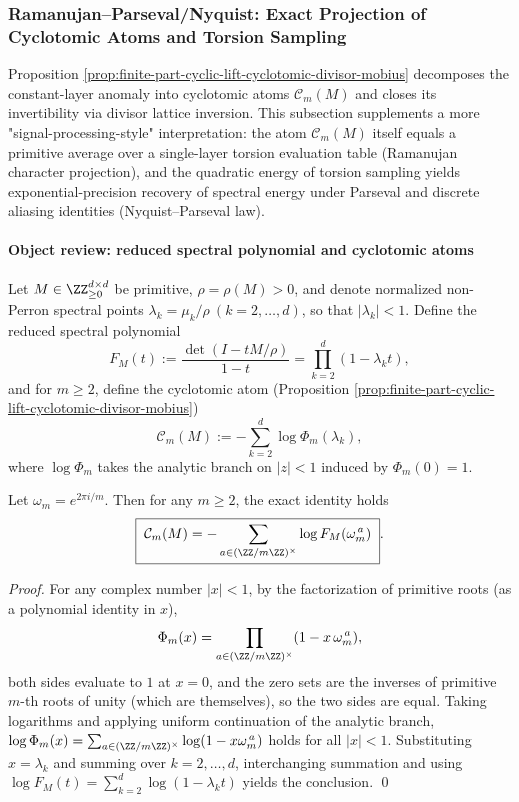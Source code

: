 
\subsubsection{Ramanujan--Parseval/Nyquist: Exact Projection of Cyclotomic Atoms and Torsion Sampling}\label{subsubsec:finite-part-ramanujan-parseval-nyquist}
Proposition \ref{prop:finite-part-cyclic-lift-cyclotomic-divisor-mobius} decomposes the constant-layer anomaly into cyclotomic atoms \(\mathcal{C}_m(M)\) and closes its invertibility via divisor lattice inversion.
This subsection supplements a more "signal-processing-style" interpretation: the atom \(\mathcal{C}_m(M)\) itself equals a primitive average over a single-layer torsion evaluation table (Ramanujan character projection), and the quadratic energy of torsion sampling yields exponential-precision recovery of spectral energy under Parseval and discrete aliasing identities (Nyquist--Parseval law).

\paragraph{Object review: reduced spectral polynomial and cyclotomic atoms}
Let \(M\in\ZZ_{\ge0}^{d\times d}\) be primitive, \(\rho=\rho(M)>0\), and denote normalized non-Perron spectral points \(\lambda_k=\mu_k/\rho\ (k=2,\dots,d)\), so that \(|\lambda_k|<1\).
Define the reduced spectral polynomial
\[
F_M(t):=\frac{\det(I-tM/\rho)}{1-t}=\prod_{k=2}^{d}(1-\lambda_k t),
\]
and for \(m\ge 2\), define the cyclotomic atom (Proposition \ref{prop:finite-part-cyclic-lift-cyclotomic-divisor-mobius})
\[
\mathcal{C}_m(M):=-\sum_{k=2}^{d}\log \Phi_m(\lambda_k),
\]
where \(\log\Phi_m\) takes the analytic branch on \(|z|<1\) induced by \(\Phi_m(0)=1\).

\begin{theorem}\label{thm:finite-part-cyclotomic-atom-primitive-torsion-average}
Let \(\omega_m=e^{2\pi i/m}\). Then for any \(m\ge 2\), the exact identity holds
\[
\boxed{\;
\mathcal{C}_m(M)=-\sum_{a\in(\ZZ/m\ZZ)^\times}\log F_M(\omega_m^{\,a})\; }.
\]
\end{theorem}
\begin{proof}
For any complex number \(|x|<1\), by the factorization of primitive roots (as a polynomial identity in \(x\)),
\[
\Phi_m(x)=\prod_{a\in(\ZZ/m\ZZ)^\times}(1-x\,\omega_m^{\,a}),
\]
both sides evaluate to \(1\) at \(x=0\), and the zero sets are the inverses of primitive \(m\)-th roots of unity (which are themselves), so the two sides are equal.
Taking logarithms and applying uniform continuation of the analytic branch,
\(
\log\Phi_m(x)=\sum_{a\in(\ZZ/m\ZZ)^\times}\log(1-x\omega_m^{\,a})
\)
holds for all \(|x|<1\).
Substituting \(x=\lambda_k\) and summing over \(k=2,\dots,d\), interchanging summation and using
\(
\log F_M(t)=\sum_{k=2}^{d}\log(1-\lambda_k t)
\)
yields the conclusion. \qed
\end{proof}

